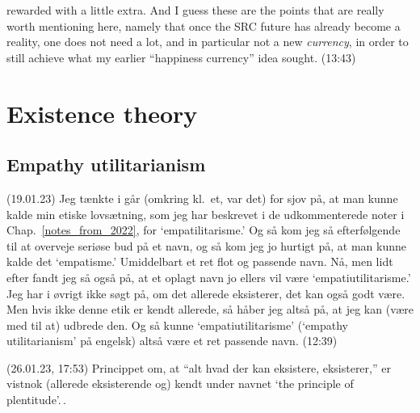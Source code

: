 \documentclass{report}
\begin{document}
rewarded with a little extra. And I guess these are the points that are really worth mentioning here, namely that once the SRC future has already become a reality, one does not need a lot, and in particular not a new \emph{currency}, in order to still achieve what my earlier ``happiness currency'' idea sought. (13:43)


















\chapter{Existence theory}


\section{Empathy utilitarianism}

(19.01.23) Jeg tænkte i går (omkring kl.\ et, var det) for sjov på, at man kunne kalde min etiske lovsætning, som jeg har beskrevet i de udkommenterede noter i Chap.\ \ref{notes_from_2022}, for `empatilitarisme.' Og så kom jeg så efterfølgende til at overveje seriøse bud på et navn, og så kom jeg jo hurtigt på, at man kunne kalde det `empatisme.' Umiddelbart et ret flot og passende navn. Nå, men lidt efter fandt jeg så også på, at et oplagt navn jo ellers vil være `empatiutilitarisme.' Jeg har i øvrigt ikke søgt på, om det allerede eksisterer, det kan også godt være. Men hvis ikke denne etik er kendt allerede, så håber jeg altså på, at jeg kan (være med til at) udbrede den. Og så kunne `empatiutilitarisme' (`empathy utilitarianism' på engelsk) altså være et ret passende navn. (12:39)



(26.01.23, 17:53) Princippet om, at ``alt hvad der kan eksistere, eksisterer,'' er vistnok (allerede eksisterende og) kendt under navnet `the principle of plentitude'.\,.
\end{document}
